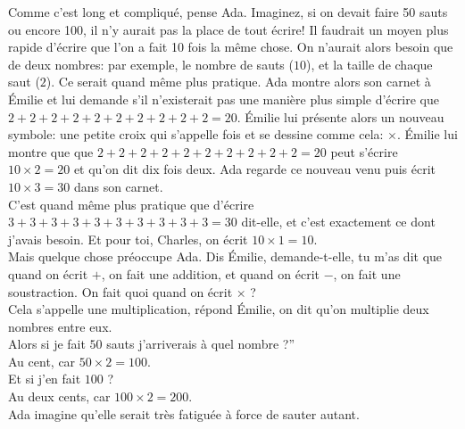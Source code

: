 Comme c’est long et compliqué, pense Ada. 
Imaginez, si on devait faire 50 sauts ou encore 100, il n’y aurait pas la place de tout écrire! 
Il faudrait un moyen plus rapide d’écrire que l’on a fait 10 fois la même chose. On n’aurait alors besoin que de deux nombres: par exemple, le nombre de sauts ($10$), et la taille de chaque saut ($2$). Ce serait quand même plus pratique. 
Ada montre alors son carnet à Émilie et lui demande s'il n’existerait pas une manière plus simple d’écrire que $2+2+2+2+2+2+2+2+2+2=20$. Émilie lui présente alors un nouveau symbole: une petite croix qui s’appelle \guillemotleft fois \guillemotright et se dessine comme cela: $\times$. Émilie lui montre que que $2+2+2+2+2+2+2+2+2+2=20$ peut s’écrire $10 \times 2 = 20$ et qu’on dit dix fois deux.
Ada regarde ce nouveau venu puis écrit $10 \times 3 = 30$ dans son carnet. 
\\
\guillemotleft C’est quand même plus pratique que d’écrire $3+3+3+3+3+3+3+3+3+3=30$ dit-elle, et c’est exactement ce dont j’avais besoin. Et pour toi, Charles, on écrit $10 \times 1 = 10$. \guillemotright\\
Mais quelque chose préoccupe Ada. 
\guillemotleft Dis Émilie, demande-t-elle, tu m’as dit que quand on écrit $+$, on fait une addition, et quand on écrit $-$, on fait une soustraction. On fait quoi quand on écrit $\times$ ?\\
\mdash Cela s’appelle une multiplication, répond Émilie, on dit qu’on multiplie deux nombres entre eux.\\
\mdash Alors si je fait $50$ sauts j’arriverais à quel nombre ?”\\
\mdash Au cent, car $50 \times 2 = 100$.\\
\mdash Et si j’en fait $100$ ?\\
\mdash Au deux cents, car $100 \times 2 = 200$. \guillemotright\\
Ada imagine qu'elle serait très fatiguée à force de sauter autant.
